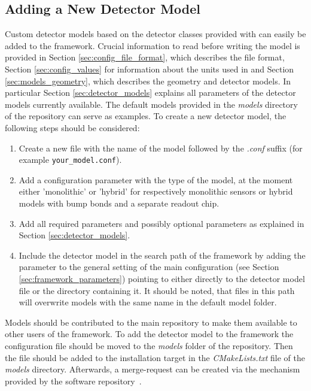 \subsection{Adding a New Detector Model}
\label{sec:adding_detector_model}
Custom detector models based on the detector classes provided with \apsq can easily be added to the framework.
Crucial information to read before writing the model is provided in Section \ref{sec:config_file_format}, which  describes the file format, Section \ref{sec:config_values} for information about the units used in \apsq and Section \ref{sec:models_geometry}, which describes the geometry and detector models.
In particular Section \ref{sec:detector_models} explains all parameters of the detector models currently available.
The default models provided in the \textit{models} directory of the repository can serve as examples.
To create a new detector model, the following steps should be considered:
\begin{enumerate}
\item Create a new file with the name of the model followed by the \textit{.conf} suffix (for example \texttt{your\_model.conf}).
\item Add a configuration parameter  with the type of the model, at the moment either 'monolithic' or 'hybrid' for respectively monolithic sensors or hybrid models with bump bonds and a separate readout chip.
\item Add all required parameters and possibly optional parameters as explained in Section \ref{sec:detector_models}.
\item Include the detector model in the search path of the framework by adding the  parameter to the general setting of the main configuration (see Section \ref{sec:framework_parameters}) pointing to either directly to the detector model file or the directory containing it. It should be noted, that files in this path will overwrite models with the same name in the default model folder.
\end{enumerate}

Models should be contributed to the main repository to make them available to other users of the framework.
To add the detector model to the framework the configuration file should be moved to the \textit{models} folder of the repository.
Then the file should be added to the installation target in the \textit{CMakeLists.txt} file of the \textit{models} directory.
Afterwards, a merge-request can be created via the mechanism provided by the software repository~\cite{ap2-repo}.
